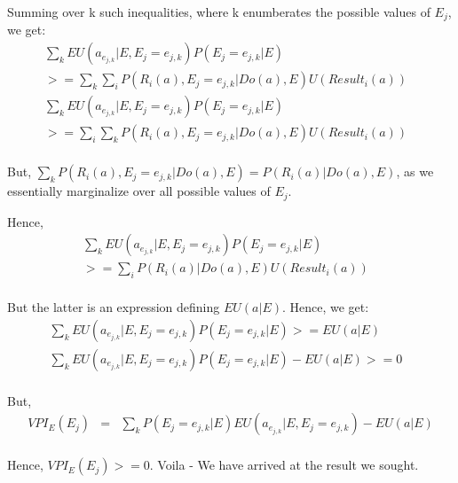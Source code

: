 \documentclass[10pt]{article}
\begin{document}
Summing over k such inequalities, where k enumberates the possible values of $E_{j}$, we get:
\begin{eqnarray}
\sum_{k} EU(a_{e_{j,k}}|E,E_{j}=e_{j,k})P(E_{j}=e_{j,k}|E) & \\
>= \sum_{k}\sum_{i} P(R_{i}(a),E_{j}=e_{j,k}|Do(a),E) U(Result_{i}(a)) &\\
\sum_{k} EU(a_{e_{j,k}}|E,E_{j}=e_{j,k})P(E_{j}=e_{j,k}|E) & \\
>= \sum_{i} \sum_{k}P(R_{i}(a),E_{j}=e_{j,k}|Do(a),E) U(Result_{i}(a)) &\\
\end{eqnarray}

But, $\sum_{k}P(R_{i}(a),E_{j}=e_{j,k}|Do(a),E) = P(R_{i}(a)|Do(a),E)$, as we essentially marginalize over all possible values of $E_{j}$.

Hence, 
\begin{eqnarray}
\sum_{k} EU(a_{e_{j,k}}|E,E_{j}=e_{j,k})P(E_{j}=e_{j,k}|E) & \\
>= \sum_{i} P(R_{i}(a)|Do(a),E) U(Result_{i}(a)) &\\
\end{eqnarray}

But the latter is an expression defining $EU(a|E)$.
Hence, we get:
\begin{eqnarray}
\sum_{k} EU(a_{e_{j,k}}|E,E_{j}=e_{j,k})P(E_{j}=e_{j,k}|E) >= EU(a|E) &\\
\sum_{k} EU(a_{e_{j,k}}|E,E_{j}=e_{j,k})P(E_{j}=e_{j,k}|E) - EU(a|E) >= 0 &\\
\end{eqnarray}

But,
\begin{eqnarray}
VPI_{E}(E_{j}) & = & \sum_{k} P(E_{j}=e_{j,k}|E)EU(a_{e_{j,k}}|E,E_{j}=e_{j,k})-EU(a|E)\\
\end{eqnarray}

Hence, $VPI_{E}(E_{j}) >=0$. Voila - We have arrived at the result we sought.
\end{document}
